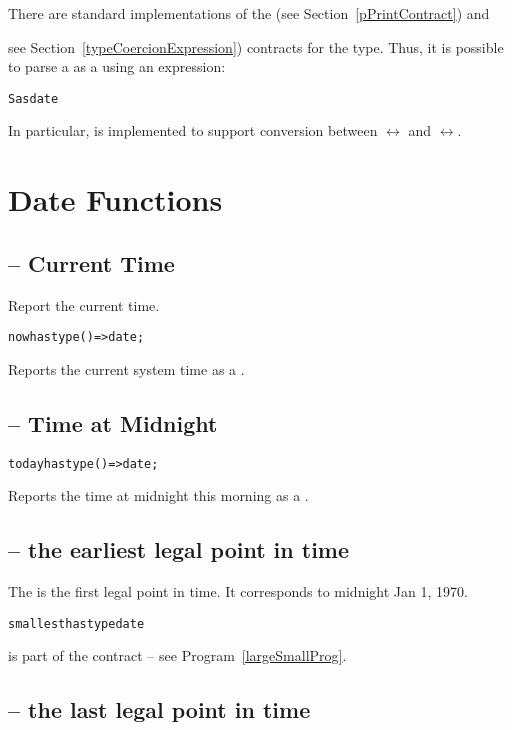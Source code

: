 There are standard implementations of the  (see Section~\vref{pPrintContract}) and  {see Section~\vref{typeCoercionExpression}) contracts for the  type. Thus, it is possible to parse a  as a  using an expression:
\begin{alltt}
S as date
\end{alltt}
In particular,  is implemented to support conversion between $\leftrightarrow$ and $\leftrightarrow$.

\section{Date Functions}

\subsection{ -- Current Time}
\label{nowFun}
Report the current time.
\begin{alltt}
now has type ()=>date;
\end{alltt}

Reports the current system time as a .

\subsection{ -- Time at Midnight}

\begin{alltt}
today has type ()=>date;
\end{alltt}

Reports the time at midnight this morning as a .

\subsection{ -- the earliest legal point in time}
\label{smallestDate}
The   is the first legal point in time. It corresponds to midnight Jan 1, 1970.
\begin{alltt}
smallest has type date
\end{alltt}
 is part of the  contract -- see Program~\vref{largeSmallProg}.

\subsection{ -- the last legal point in time}
\label{largestDate}

}
